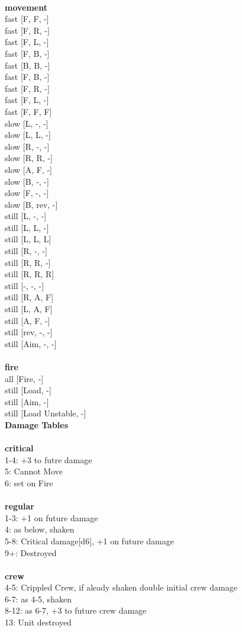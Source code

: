 \ \\ {\bf movement } \\
fast [F, F, -] \\
fast [F, R, -] \\
fast [F, L, -] \\
fast [F, B, -] \\
fast [B, B, -] \\
fast [F, B, -] \\
fast [F, R, -] \\
fast [F, L, -] \\
fast [F, F, F] \\
slow [L, -, -] \\
slow [L, L, -] \\
slow [R, -, -] \\
slow [R, R, -] \\
slow [A, F, -] \\
slow [B, -, -] \\
slow [F, -, -] \\
slow [B, rev, -] \\
still [L, -, -] \\
still [L, L, -] \\
still [L, L, L] \\
still [R, -, -] \\
still [R, R, -] \\
still [R, R, R] \\
still [-, -, -] \\
still [R, A, F] \\
still [L, A, F] \\
still [A, F, -] \\
still [rev, -, -] \\
still [Aim, -, -] \\
\ \\ {\bf fire } \\
all [Fire, -] \\
still [Load, -] \\
still [Aim, -] \\
still [Load Unstable, -] \\


{\bf Damage Tables} \\
\ \\ {\bf critical } \\
1-4: +3 to futre damage \\
5: Cannot Move \\
6: set on Fire \\
\ \\ {\bf regular } \\
1-3: +1 on future damage \\
4: as below, shaken \\
5-8: Critical damage[d6], +1 on future damage \\
9+: Destroyed \\
\ \\ {\bf crew } \\
4-5: Crippled Crew, if aleady shaken double initial crew damage \\
6-7: as 4-5, shaken \\
8-12: as 6-7, +3 to future crew damage \\
13: Unit destroyed \\


